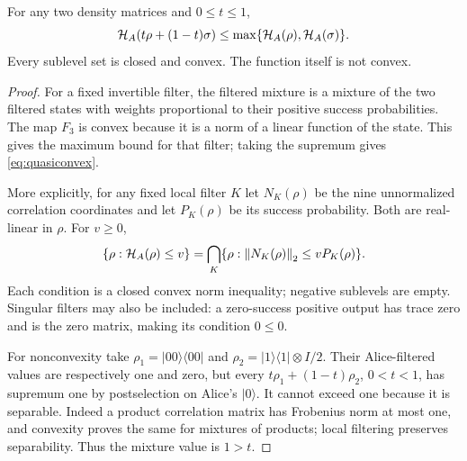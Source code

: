 \begin{theorem}\label{thm:quasiconvex}
For any two density matrices and $0\leq t\leq1$,
\begin{equation}\label{eq:quasiconvex}
 \mathcal H_A(t\rho+(1-t)\sigma)
 \leq\max\{\mathcal H_A(\rho),\mathcal H_A(\sigma)\}.
\end{equation}
Every sublevel set is closed and convex. The function itself is not convex.
\end{theorem}
\begin{proof}
For a fixed invertible filter, the filtered mixture is a mixture of the
two filtered states with weights proportional to their positive success
probabilities. The map $F_3$ is convex because it is a norm of a linear
function of the state. This gives the maximum bound for that filter;
taking the supremum gives \eqref{eq:quasiconvex}.

More explicitly, for any fixed local filter $K$ let $N_K(\rho)$ be the
nine unnormalized correlation coordinates and let $P_K(\rho)$ be its
success probability. Both are real-linear in $\rho$. For $v\geq0$,
\[
 \{\rho:\mathcal H_A(\rho)\leq v\}
 =\bigcap_K\{\rho:\left\lVert N_K(\rho)\right\rVert_2\leq vP_K(\rho)\}.
\]
Each condition is a closed convex norm inequality; negative sublevels are empty. Singular filters may
also be included: a zero-success positive output has trace zero and is
the zero matrix, making its condition $0\leq0$.

For nonconvexity take
$\rho_1=|00\rangle\langle00|$ and
$\rho_2=|1\rangle\langle1|\otimes I/2$.
Their Alice-filtered values are respectively one and zero, but every
$t\rho_1+(1-t)\rho_2$, $0<t<1$, has supremum one by postselection on
Alice's $|0\rangle$. It cannot exceed one because it is separable.
Indeed a product correlation matrix has Frobenius norm at most one,
and convexity proves the same for mixtures of products; local filtering
preserves separability. Thus the mixture value is $1>t$.
\end{proof}

